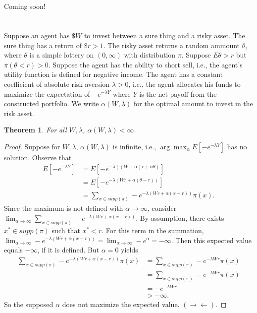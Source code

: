 \documentclass[12pt]{article}
\newtheorem{thm}{Theorem}[section]
\theoremstyle{definition}
\theoremstyle{remark}
\def\contra{\rightarrow \leftarrow}
\begin{document}
\section{}
Coming soon!
%
%
\section{}
Suppose an agent has $\$ W$ to invest between a sure thing and a risky asset. The sure thing has a return of $\$ r > 1$. The risky asset returns a random ammount $\theta$, where $\theta$ is a simple lottery on $(0, \infty)$ with distribution $\pi$. Suppose $E \theta > r$ but $\pi (\theta < r) > 0$. Suppose the agent has the ability to short sell, i.e., the agent's utility function is defined for negative income.
The agent has a constant coefficient of absolute risk aversion $\lambda > 0$, i.e., the agent allocates his funds to maximize the expectation of $-e^{- \lambda Y}$ where $Y$ is the net payoff from the constructed portfolio. We write $\alpha(W, \lambda)$ for the optimal amount to invest in the risk asset.
\begin{thm}
  For all $W, \lambda$, $\alpha(W, \lambda) < \infty$.
\end{thm}
\begin{proof}
  Suppose for $W, \lambda$, $\alpha(W, \lambda)$ is infinite, i.e., $\arg \max_\alpha E \left[-e^{- \lambda Y} \right]$ has no solution. Observe that
  \begin{align*}
    E \left[-e^{- \lambda Y} \right] &= E \left[-e^{- \lambda ((W - \alpha)r + \alpha \theta)} \right] \\
    &= E \left[-e^{- \lambda (Wr + \alpha (\theta - r))} \right] \\
    &= \sum_{x \in supp(\pi)} -e^{- \lambda (Wr + \alpha (x - r))} \pi(x).
  \end{align*}
  Since the maximum is not defined with $\alpha \rightarrow \infty$, consider $\lim_{\alpha \rightarrow \infty} \sum_{x \in supp(\pi)} -e^{- \lambda (Wr + \alpha (x - r))}$. By assumption, there exists $x^* \in supp(\pi)$ such that $x^* < r$.
  For this term in the summation, $\lim_{\alpha \rightarrow \infty} -e^{- \lambda(Wr + \alpha(x - r))} = \lim_{\alpha \rightarrow \infty} -e^{\alpha} = - \infty$.
  Then this expected value equals $- \infty$, if it is defined. But $\alpha = 0$ yields
  \begin{align*}
    \sum_{x \in supp(\pi)} -e^{- \lambda (Wr + \alpha (x - r))} \pi(x) &= \sum_{x \in supp(\pi)} -e^{- \lambda Wr } \pi(x) \\
    &= \sum_{x \in supp(\pi)} -e^{- \lambda Wr } \pi(x) \\
    &= -e^{- \lambda Wr } \\
    &> - \infty.
  \end{align*}
  So the supposed $\alpha$ does not maximize the expected value. $(\contra)$.
\end{proof}
\end{document}
